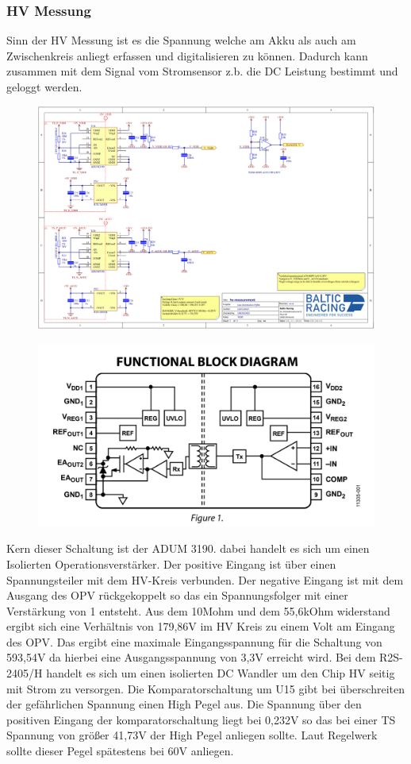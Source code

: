 \subsubsection{HV Messung}
Sinn der HV Messung ist es die Spannung welche am Akku als auch am Zwischenkreis anliegt erfassen und digitalisieren zu können. Dadurch kann zusammen mit dem Signal vom Stromsensor z.b. die DC Leistung bestimmt und geloggt werden. 

\begin{figure}
	\centering
	\includegraphics[width=0.7\linewidth]{bilder/HV_Measurement_PNG}
	\caption{}
	\label{fig:hvmeasurementpng}
\end{figure}

\begin{figure}
	\centering
	\includegraphics[width=0.4\linewidth]{"bilder/Blockdiagramm ADUM3190"}
	\caption{}
	\label{fig:blockdiagramm-adum3190}
\end{figure}

Kern dieser Schaltung ist der ADUM 3190. dabei handelt es sich um einen Isolierten Operationsverstärker. Der positive Eingang ist über einen Spannungsteiler mit dem HV-Kreis verbunden. Der negative Eingang ist mit dem Ausgang des OPV rückgekoppelt so das ein Spannungsfolger mit einer Verstärkung von 1 entsteht. Aus dem 10Mohm und dem 55,6kOhm widerstand ergibt sich eine Verhältnis von 179,86V im HV Kreis zu einem Volt am Eingang des OPV. Das ergibt eine maximale Eingangsspannung für die Schaltung von 593,54V da hierbei eine Ausgangsspannung von 3,3V erreicht wird. Bei dem R2S-2405/H handelt es sich um einen isolierten DC Wandler um den Chip HV seitig mit Strom zu versorgen. Die Komparatorschaltung um U15 gibt bei überschreiten der gefährlichen Spannung einen High Pegel aus. Die Spannung über den positiven Eingang der komparatorschaltung liegt bei 0,232V so das bei einer TS Spannung von größer 41,73V der High Pegel anliegen sollte. Laut Regelwerk sollte dieser Pegel spätestens bei 60V anliegen.

